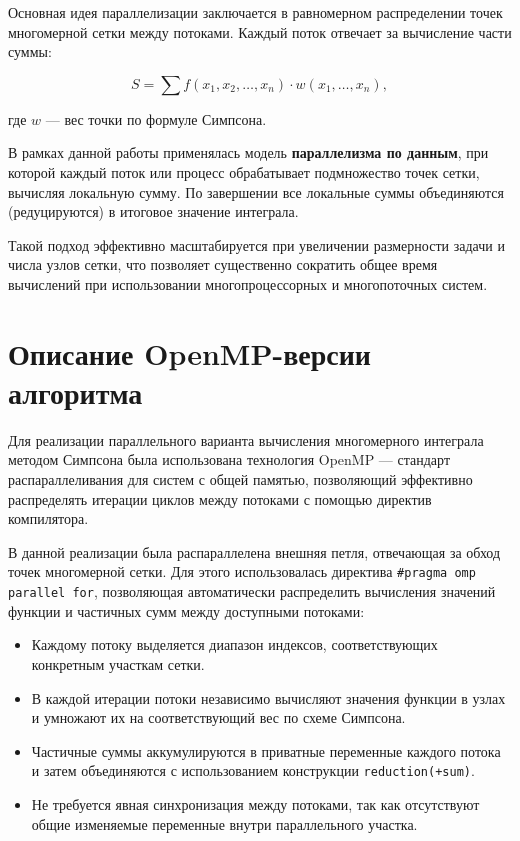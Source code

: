 \documentclass[14pt,a4paper]{extarticle}
\begin{document}
Основная идея параллелизации заключается в равномерном распределении точек многомерной сетки между потоками. Каждый поток отвечает за вычисление части суммы:

$$
S = \sum f(x_1, x_2, \dots, x_n) \cdot w(x_1, \dots, x_n),
$$

где $w$ — вес точки по формуле Симпсона.

В рамках данной работы применялась модель \textbf{параллелизма по данным}, при которой каждый поток или процесс обрабатывает подмножество точек сетки, вычисляя локальную сумму. По завершении все локальные суммы объединяются (редуцируются) в итоговое значение интеграла.

Такой подход эффективно масштабируется при увеличении размерности задачи и числа узлов сетки, что позволяет существенно сократить общее время вычислений при использовании многопроцессорных и многопоточных систем.


\section{Описание OpenMP-версии алгоритма}

Для реализации параллельного варианта вычисления многомерного интеграла методом Симпсона была использована технология OpenMP — стандарт распараллеливания для систем с общей памятью, позволяющий эффективно распределять итерации циклов между потоками с помощью директив компилятора.

В данной реализации была распараллелена внешняя петля, отвечающая за обход точек многомерной сетки. Для этого использовалась директива \texttt{\#pragma omp parallel for}, позволяющая автоматически распределить вычисления значений функции и частичных сумм между доступными потоками:

\begin{itemize}
    \item Каждому потоку выделяется диапазон индексов, соответствующих конкретным участкам сетки.
    
    \item В каждой итерации потоки независимо вычисляют значения функции в узлах и умножают их на соответствующий вес по схеме Симпсона.
    
    \item Частичные суммы аккумулируются в приватные переменные каждого потока и затем объединяются с использованием конструкции \texttt{reduction(+\:sum)}.
    
    \item Не требуется явная синхронизация между потоками, так как отсутствуют общие изменяемые переменные внутри параллельного участка.
\end{itemize}
\end{document}
